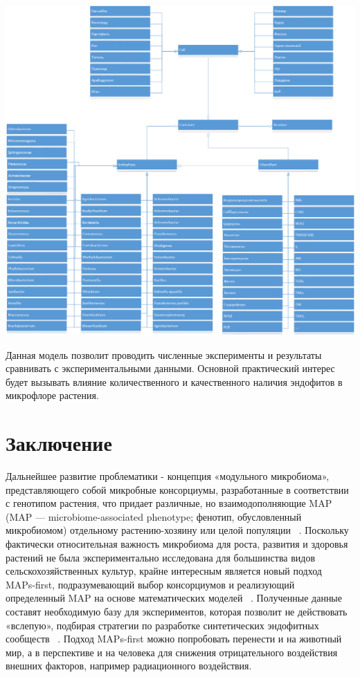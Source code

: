 \documentclass[11pt]{article}
\begin{document}
	\includegraphics[width=\textwidth]{uml_classes}
	
	Данная модель позволит проводить численные эксперименты и результаты сравнивать с экспериментальными данными. Основной практический интерес будет вызывать влияние количественного и качественного наличия эндофитов	в микрофлоре растения.
	
	\section{Заключение}
	Дальнейшее развитие проблематики - концепция «модульного микробиома», представляющего собой микробные консорциумы, разработанные в соответствии с генотипом растения, что придает различные, но взаимодополняющие MAP (MAP — microbiome-associated phenotype;  фенотип, обусловленный микробиомом) отдельному растению-хозяину или целой популяции ~\cite{j.mib.2017.11.023}. Поскольку фактически относительная важность микробиома для роста, развития и здоровья растений не была экспериментально исследована для большинства видов сельскохозяйственных культур, крайне интересным является новый подход MAPs-first, подразумевающий выбор консорциумов и реализующий определенный MAP на основе математических моделей ~\cite{j.mib.2017.11.023}. Полученные данные составят необходимую базу для экспериментов, которая позволит не действовать «вслепую», подбирая стратегии по разработке синтетических эндофитных сообществ ~\cite{ecogen17119-32}.
	Подход MAPs-first можно попробовать перенести и на животный мир, а в перспективе и на человека для снижения отрицательного воздействия внешних факторов, например радиационного воздействия.
	
\end{document}
